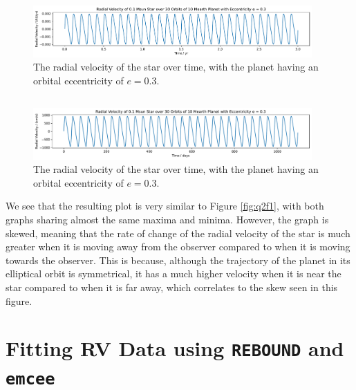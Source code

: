 \documentclass{article}
\newcommand{\rebound}{\texttt{REBOUND}}
\begin{document}
\begin{figure}[htp]
    \centering
    \includegraphics[width=0.95\textwidth]{q2f5.pdf}
    \captionsetup{justification=centering}
    \caption{The radial velocity of the star over time, with the planet having an orbital eccentricity of $e = 0.3$.}
    \label{fig:q2f5}
\end{figure}

\subsection{}

\begin{figure}[htp]
    \centering
    \includegraphics[width=0.95\textwidth]{q2f6.pdf}
    \captionsetup{justification=centering}
    \caption{The radial velocity of the star over time, with the planet having an orbital eccentricity of $e = 0.3$.}
    \label{fig:q2f6}
\end{figure}

We see that the resulting plot is very similar to Figure \ref{fig:q2f1}, with both graphs sharing almost the same maxima and minima. However, the graph is skewed, meaning that the rate of change of the radial velocity of the star is much greater when it is moving away from the observer compared to when it is moving towards the observer. This is because, although the trajectory of the planet in its elliptical orbit is symmetrical, it has a much higher velocity when it is near the star compared to when it is far away, which correlates to the skew seen in this figure. 

\newpage

\section{Fitting RV Data using \rebound{} and \texttt{emcee}}

\subsection{}
\end{document}
